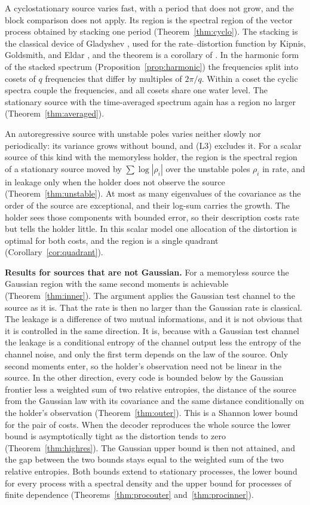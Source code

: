 \documentclass[11pt,onecolumn]{IEEEtran}
\begin{document}
A cyclostationary source varies fast, with a period that does not
grow, and the block comparison does not apply. Its region is the
spectral region of the vector process obtained by stacking one period
(Theorem~\ref{thm:cyclo}). The stacking is the classical device of
Gladyshev \cite{gladyshev1961}, used for the rate--distortion function
by Kipnis, Goldsmith, and Eldar \cite{kipnis2018}, and the theorem is
a corollary of \cite{part2}. In the harmonic form of the stacked
spectrum (Proposition~\ref{prop:harmonic}) the frequencies split into
cosets of $q$ frequencies that differ by multiples of $2\pi/q$. Within
a coset the cyclic spectra couple the frequencies, and all cosets
share one water level. The stationary source with the time-averaged
spectrum again has a region no larger
(Theorem~\ref{thm:averaged}).

An autoregressive source with unstable poles varies neither slowly nor
periodically: its variance grows without bound, and (L3) excludes it.
For a scalar source of this kind with the memoryless holder, the region
is the spectral region of a stationary source moved by
$\sum\log|\rho_i|$ over the unstable poles $\rho_i$ in rate, and in
leakage only when the holder does not observe the source
(Theorem~\ref{thm:unstable}). At most as many eigenvalues of the
covariance as the order of the source are exceptional, and their
log-sum carries the growth. The holder sees those components with
bounded error, so their description costs rate but tells the holder
little. In this scalar model one allocation of the distortion is
optimal for both costs, and the region is a single quadrant
(Corollary~\ref{cor:quadrant}).

\textbf{Results for sources that are not Gaussian.} For a memoryless
source the Gaussian region with the same second moments is achievable
(Theorem~\ref{thm:inner}). The argument applies the Gaussian test
channel to the source as it is. That the rate is then no larger than
the Gaussian rate is classical. The leakage is a difference of two
mutual informations, and it is not obvious that it is controlled in
the same direction. It is, because with a Gaussian test channel the
leakage is a conditional entropy of the channel output less the
entropy of the channel noise, and only the first term depends on the
law of the source. Only second moments enter, so the holder's
observation need not be linear in the source. In the other direction,
every code is bounded below by the Gaussian frontier less a weighted
sum of two relative entropies, the distance of the source from the
Gaussian law with its covariance and the same distance conditionally
on the holder's observation (Theorem~\ref{thm:outer}). This is a
Shannon lower bound for the pair of costs. When the decoder reproduces
the whole source the lower bound is asymptotically tight as the
distortion tends to zero (Theorem~\ref{thm:highres}). The Gaussian
upper bound is then not attained, and the gap between the two bounds
stays equal to the weighted sum of the two relative entropies. Both bounds extend to stationary
processes, the lower bound for every process with a spectral density
and the upper bound for processes of finite dependence
(Theorems~\ref{thm:procouter} and~\ref{thm:procinner}).
\end{document}
